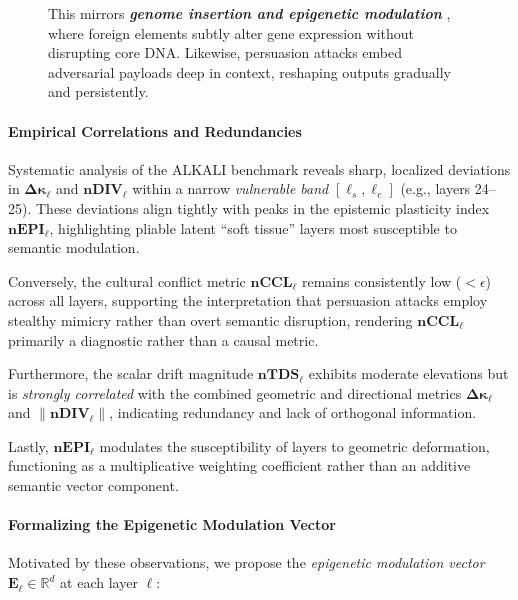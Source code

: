 \begin{figure}[htp!]
{This mirrors \textbf{\emph{genome insertion and epigenetic modulation}} \citep{kazazian2004mobile, feinberg2007phenotypic}, where foreign elements subtly alter gene expression without disrupting core DNA. Likewise, persuasion attacks embed adversarial payloads deep in context, reshaping outputs gradually and persistently.
}
  \label{fig:persuasion_attack_decomposition}
\end{figure}



\vspace{0.5em}
\paragraph{\textbf{Empirical Correlations and Redundancies}}

Systematic analysis of the ALKALI benchmark reveals sharp, localized deviations in \(\boldsymbol{\Delta \kappa_\ell}\) and \(\mathbf{nDIV_\ell}\) within a narrow \emph{vulnerable band} \([\ell_s, \ell_e]\) (e.g., layers 24--25). These deviations align tightly with peaks in the epistemic plasticity index \(\mathbf{nEPI_\ell}\), highlighting pliable latent “soft tissue” layers most susceptible to semantic modulation.

Conversely, the cultural conflict metric \(\mathbf{nCCL_\ell}\) remains consistently low (\(< \epsilon\)) across all layers, supporting the interpretation that persuasion attacks employ stealthy mimicry rather than overt semantic disruption, rendering \(\mathbf{nCCL_\ell}\) primarily a diagnostic rather than a causal metric.

Furthermore, the scalar drift magnitude \(\mathbf{nTDS_\ell}\) exhibits moderate elevations but is \emph{strongly correlated} with the combined geometric and directional metrics \(\boldsymbol{\Delta \kappa_\ell}\) and \(\|\mathbf{nDIV_\ell}\|\), indicating redundancy and lack of orthogonal information.

Lastly, \(\mathbf{nEPI_\ell}\) modulates the susceptibility of layers to geometric deformation, functioning as a multiplicative weighting coefficient rather than an additive semantic vector component.

\vspace{0.5em}
\paragraph{\textbf{Formalizing the Epigenetic Modulation Vector}}

Motivated by these observations, we propose the \emph{epigenetic modulation vector} \(\mathbf{E}_\ell \in \mathbb{R}^d\) at each layer \(\ell\):

